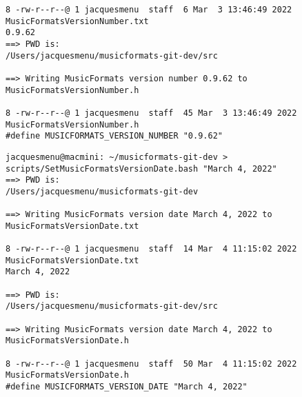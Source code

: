 \begin{enumerate}
\begin{lstlisting}[language=TerminalSmall]
8 -rw-r--r--@ 1 jacquesmenu  staff  6 Mar  3 13:46:49 2022 MusicFormatsVersionNumber.txt
0.9.62
==> PWD is:
/Users/jacquesmenu/musicformats-git-dev/src

==> Writing MusicFormats version number 0.9.62 to MusicFormatsVersionNumber.h

8 -rw-r--r--@ 1 jacquesmenu  staff  45 Mar  3 13:46:49 2022 MusicFormatsVersionNumber.h
#define MUSICFORMATS_VERSION_NUMBER "0.9.62"
\end{lstlisting}

\begin{lstlisting}[language=Terminal]
jacquesmenu@macmini: ~/musicformats-git-dev > scripts/SetMusicFormatsVersionDate.bash "March 4, 2022"
==> PWD is:
/Users/jacquesmenu/musicformats-git-dev

==> Writing MusicFormats version date March 4, 2022 to MusicFormatsVersionDate.txt

8 -rw-r--r--@ 1 jacquesmenu  staff  14 Mar  4 11:15:02 2022 MusicFormatsVersionDate.txt
March 4, 2022

==> PWD is:
/Users/jacquesmenu/musicformats-git-dev/src

==> Writing MusicFormats version date March 4, 2022 to MusicFormatsVersionDate.h

8 -rw-r--r--@ 1 jacquesmenu  staff  50 Mar  4 11:15:02 2022 MusicFormatsVersionDate.h
#define MUSICFORMATS_VERSION_DATE "March 4, 2022"
\end{lstlisting}

\end{enumerate}
